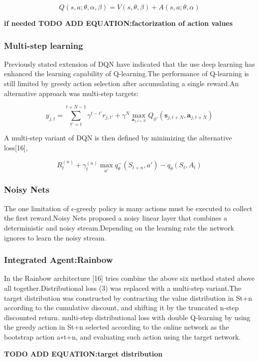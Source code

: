 \begin{equation}
    Q(s,a; \theta,\alpha,\beta) = V(s,\theta,\beta) + A(s,a; \theta,\alpha)
\end{equation}

\textbf{if needed TODO ADD EQUATION:factorization of action values}

\subsubsection{Multi-step learning}

Previously stated extension of DQN have indicated that the use deep learning has enhanced the learning capability of Q-learning.The performance of  Q-learning is still limited by greedy action selection after accumulating a single reward.An alternative approach was multi-step targets:
 
 \begin{equation}
		y_{j,t} = \sum_{t'=t}^{t+N-1} \gamma^{t-t'}    r_{j,t'} + \gamma^N  \max_{\bm{a}_{j,t+N}}Q_{\phi'}(\bm{s}_{j,t+N}, \bm{a}_{j,t+N}) 
\end{equation}

A multi-step variant of DQN is then defined by minimizing
the alternative loss[16],

\begin{equation}
	    R_t^{(n)} +  \gamma_t^{(n)}  \max_{a'} q_\theta^{-}(S_{t+n},a') - q_{\theta}(S_t,A_t)
\end{equation}
  

\subsubsection{Noisy Nets}

The one limitation of $\mathcal{\epsilon}$-greedy policy  is many actions must be executed to collect the first reward.Noisy Nets proposed a noisy linear layer that combines  a deterministic and noisy stream.Depending on the learning rate the network ignores to learn the noisy stream.

\subsubsection{Integrated Agent:Rainbow}


In the Rainbow architecture [16]  tries combine the above six method stated above all together.Distributional loss (3) was replaced with a multi-step variant.The target distribution was constructed  by contracting the value distribution in St+n according to the cumulative discount, and shifting it by the truncated n-step discounted return. multi-step distributional loss with double Q-learning by using the greedy action in St+n selected according to the online network as the bootstrap action a∗t+n, and evaluating such action using the target network.

\textbf{TODO ADD EQUATION:target distribution}











